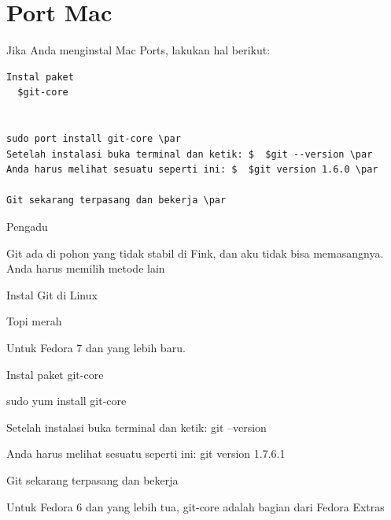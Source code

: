 \section{Port Mac}
\vspace{12pt}
\noindent 
Jika Anda menginstal Mac Ports, lakukan hal berikut: \par
\vspace{12pt}
\noindent
\begin{verbatim}
Instal paket
  $git-core
 

sudo port install git-core \par
Setelah instalasi buka terminal dan ketik: $  $git --version \par
Anda harus melihat sesuatu seperti ini: $  $git version 1.6.0 \par
 
Git sekarang terpasang dan bekerja \par

\end{verbatim} 
\noindent 
 $  $Pengadu \par
\vspace{12pt}
\noindent 
Git ada di pohon yang tidak stabil di Fink, dan aku tidak bisa memasangnya. $  $Anda harus memilih metode lain \par
\vspace{12pt}
\noindent 
 $  $Instal Git di Linux \par
\vspace{12pt}
\noindent 
 $  $Topi merah \par
\vspace{12pt}
\noindent 
Untuk Fedora 7 dan yang lebih baru. \par
\vspace{12pt}
\noindent 
Instal paket $  $git-core \par
\noindent 
sudo yum install git-core \par
\vspace{12pt}
\noindent 
Setelah instalasi buka terminal dan ketik: $  $git --version \par
\noindent 
Anda harus melihat sesuatu seperti ini: $  $git version 1.7.6.1 \par
\vspace{12pt}
\noindent 
Git sekarang terpasang dan bekerja \par
\vspace{12pt}
\noindent 
Untuk Fedora 6 dan yang lebih tua, git-core adalah bagian dari Fedora Extras  \par
\vspace{12pt}
